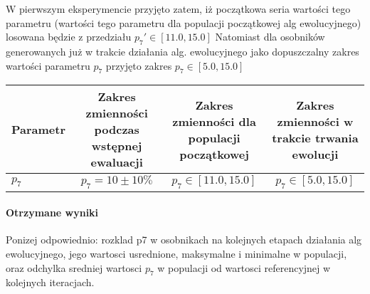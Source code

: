 \documentclass[]{article}
\let\oldparagraph\paragraph
\renewcommand{\paragraph}[1]{\oldparagraph{#1}\mbox{}}
\begin{document}
W pierwszym eksperymencie przyjęto zatem, iż początkowa seria wartości
tego parametru (wartości tego parametru dla populacji początkowej alg
ewolucyjnego) losowana będzie z przedziału \(p_7' \in [11.0,15.0]\)
Natomiast dla osobników generowanych już w trakcie działania alg.
ewolucyjnego jako dopuszczalny zakres wartości parametru \(p_7\)
przyjęto zakres \(p_7 \in [5.0,15.0]\)

\begin{longtable}[c]{@{}lccc@{}}
\toprule
\begin{minipage}[b]{0.13\columnwidth}\raggedright\strut
Parametr
\strut\end{minipage} &
\begin{minipage}[b]{0.26\columnwidth}\centering\strut
Zakres zmienności podczas wstępnej ewaluacji
\strut\end{minipage} &
\begin{minipage}[b]{0.24\columnwidth}\centering\strut
Zakres zmienności dla populacji początkowej
\strut\end{minipage} &
\begin{minipage}[b]{0.26\columnwidth}\centering\strut
Zakres zmienności w trakcie trwania ewolucji
\strut\end{minipage}\tabularnewline
\midrule
\endhead
\begin{minipage}[t]{0.13\columnwidth}\raggedright\strut
\(p_7\)
\strut\end{minipage} &
\begin{minipage}[t]{0.26\columnwidth}\centering\strut
\(p_7 = 10 \pm 10\%\)
\strut\end{minipage} &
\begin{minipage}[t]{0.24\columnwidth}\centering\strut
\(p_7 \in [11.0,15.0]\)
\strut\end{minipage} &
\begin{minipage}[t]{0.26\columnwidth}\centering\strut
\(p_7 \in [5.0,15.0]\)
\strut\end{minipage}\tabularnewline
\bottomrule
\end{longtable}

\paragraph{Otrzymane wyniki}\label{otrzymane-wyniki}

Ponizej odpowiednio: rozklad p7 w osobnikach na kolejnych etapach
działania alg ewolucyjnego, jego wartosci usrednione, maksymalne i
minimalne w populacji, oraz odchylka sredniej wartosci \(p_7\) w
populacji od wartosci referencyjnej w kolejnych iteracjach.
\end{document}
